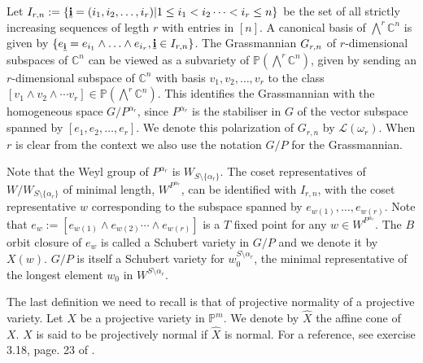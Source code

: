 Let $I_{r,n}:=\{{\bf \underline{i}} =(i_1,i_2,\ldots,i_r) |  1\leq i_1 < i_2 \cdots < i_r \leq n \}$ be the set of all strictly increasing sequences of legth $r$ with entries in $[n]$. 
 A canonical basis of $\bigwedge^r{\mathbb C}^n$ is given by $\{e_{\bf \underline{i}} = e_{i_1} \wedge \ldots \wedge e_{i_r}, {\bf \underline{i}} \in I_{r,n}\}$. The Grassmannian $G_{{r},{n}}$ of $r$-dimensional subspaces of ${\mathbb C}^n$ can be viewed as a subvariety of ${\mathbb P}(\bigwedge^r {\mathbb C}^n)$,
given by sending an $r$-dimensional
subspace of ${\mathbb C}^n$ with basis $v_1,v_2,\ldots,v_r$ to the class $[v_1 \wedge v_2 \wedge \cdots v_r] \in {\mathbb P}(\bigwedge^r {\mathbb C}^n)$. This identifies the Grassmannian  with the homogeneous space  $G/P^{\alpha_r}$, since  $P^{\alpha_r}$ is the  stabiliser in $G$ of the vector subspace spanned by $[e_1,e_2, \ldots,e_r]$. We denote this polarization of $G_{r,n}$ by ${\mathcal L}(\omega_r)$. When $r$ is clear from the context we also use the notation $G/P$ for the Grassmannian.

Note that the Weyl group of  $P^{\alpha_r}$ is  $W_{S\setminus \{\alpha_r\}}$. The coset representatives of $W/W_{S\setminus \{\alpha_r\}}$  of minimal length, $W^{P^{\alpha_r}}$, can be identified with $I_{r,n}$, with the coset representative $w$ corresponding to the subspace spanned by ${e_{w(1)},\ldots,e_{w(r)}}$. Note that $e_w := [e_{w(1)} \wedge e_{w(2)} \cdots \wedge e_{w(r)}]$  is a $T$ fixed point for any $w \in W^{P^{\alpha_r}}$. The $B$ orbit closure of $e_{w}$ is called a Schubert variety in $G/P$ and we denote it
by $X(w)$. $G/P$ is itself a Schubert variety for $w_0^{S \setminus \alpha_r}$, the minimal representative of the longest element $w_0$ in $W^{S \setminus \alpha_r}$.   

The last definition we need to recall is that of projective normality of a projective variety.
Let $X$ be a projective variety in $\mathbb{P}^{m}.$ We denote by $\hat{X}$ the affine cone of $X.$  $X$ is said to be projectively normal if $\hat{X}$ is normal. For a reference, see exercise 3.18, page. 23 of \cite{hart1977alggeo}.  

